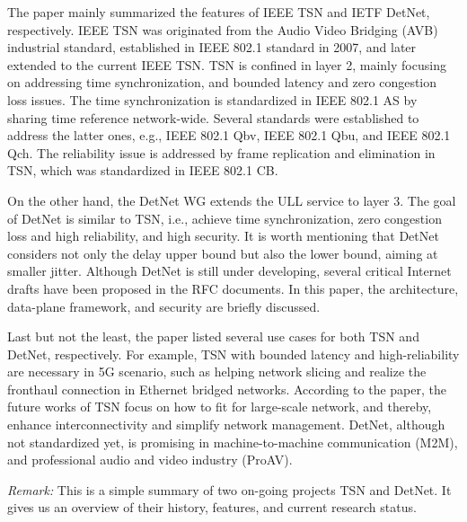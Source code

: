 \documentclass[12pt]{article}
\begin{document}
The paper mainly summarized the features of IEEE TSN and IETF DetNet, respectively. IEEE TSN was originated from the Audio Video Bridging (AVB) industrial standard, established in IEEE 802.1 standard in 2007, and later extended to the current IEEE TSN. TSN is confined in layer 2, mainly focusing on addressing time synchronization, and bounded latency and zero congestion loss issues. The time synchronization is standardized in IEEE 802.1 AS by sharing time reference network-wide. Several standards were established to address the latter ones, e.g., IEEE 802.1 Qbv, IEEE 802.1 Qbu, and IEEE 802.1 Qch. The reliability issue is addressed by frame replication and elimination in TSN, which was standardized in IEEE 802.1 CB.

On the other hand, the DetNet WG extends the ULL service to layer 3. The goal of DetNet is similar to TSN, i.e., achieve time synchronization, zero congestion loss and high reliability, and high security. It is worth mentioning that DetNet considers not only the delay upper bound but also the lower bound, aiming at smaller jitter. Although DetNet is still under developing, several critical Internet drafts have been proposed in the RFC documents. In this paper, the architecture, data-plane framework, and security are briefly discussed. 

Last but not the least, the paper listed several use cases for both TSN and DetNet, respectively. For example, TSN with bounded
latency and high-reliability are necessary in 5G scenario, such as helping network slicing and realize the fronthaul connection in Ethernet bridged networks. According to the paper, the future works of TSN focus on how to fit for large-scale network, and thereby, enhance interconnectivity and simplify network management. 
DetNet, although not standardized yet, is promising in machine-to-machine communication (M2M), and professional audio and video industry (ProAV). 

\textit{Remark:} This is a simple summary of two on-going projects TSN and DetNet. It gives us an overview of their history, features, and current research status.
\end{document}
